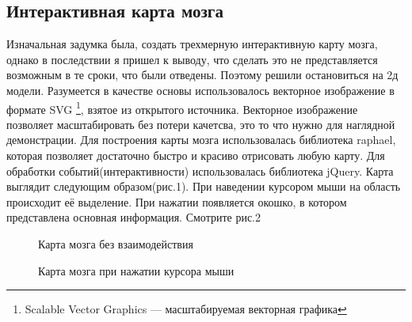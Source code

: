 \subsection{Интерактивная карта мозга}
Изначальная задумка была, создать трехмерную интерактивную карту мозга, однако в последствии я пришел к выводу, что сделать это не представляется возможным в те сроки, что были отведены. Поэтому решили остановиться на 2д модели. Разумеется в качестве основы использовалось векторное изображение в формате SVG \footnote{Scalable Vector Graphics — масштабируемая векторная графика}, взятое из открытого источника. Векторное изображение позволяет масштабировать без потери качетсва, это то что нужно для наглядной демонстрации. Для построения карты мозга использовалась библиотека raphael, которая позволяет достаточно быстро и красиво отрисовать любую карту. Для обработки событий(интерактивности) использовалась библиотека jQuery. Карта выглядит следующим образом(рис.1). При наведении курсором мыши на область происходит её выделение. При нажатии появляется окошко, в котором представлена основная информация. Смотрите рис.2
\begin{figure}[h]
	\caption{Карта мозга без взаимодействия}
	\label{fig:1}
\end{figure}
\begin{figure}[H]
	\caption{Карта мозга при нажатии курсора мыши}
	\label{fig:2}
\end{figure}

